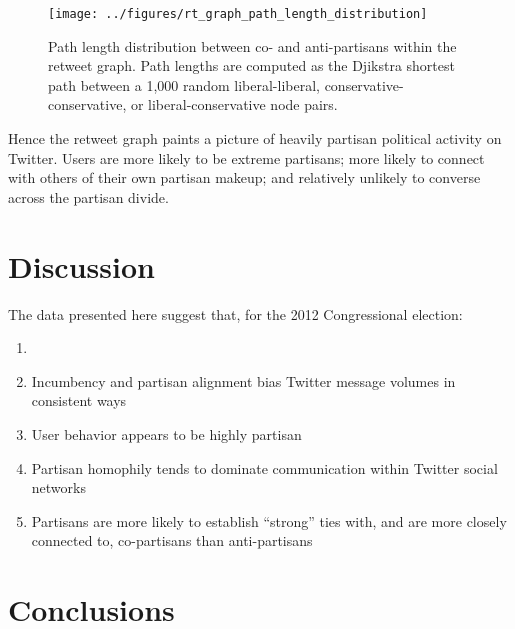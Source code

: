 \documentclass[11pt]{article}
\begin{document}
\begin{figure}[ht]
  \centering
  \texttt{[image: ../figures/rt\_graph\_path\_length\_distribution]}
  \caption{Path length distribution between co- and anti-partisans within the retweet graph. Path lengths are computed as the Djikstra shortest path between a 1,000 random liberal-liberal, conservative-conservative, or liberal-conservative node pairs. }
  \label{fig:rt-partisan-path-length}
\end{figure}

Hence the retweet graph paints a picture of heavily partisan political activity
on Twitter. Users are more likely to be extreme partisans; more likely
to connect with others of their own partisan makeup; and relatively
unlikely to converse across the partisan divide. 


\section{Discussion}
\label{sec:discussion}

The data presented here suggest that, for the 2012 Congressional election:

\begin{enumerate}
\item 
\item Incumbency and partisan alignment bias Twitter message volumes
  in consistent ways
\item User behavior appears to be highly partisan
\item Partisan homophily tends to dominate communication within
  Twitter social networks
\item  Partisans are more likely to establish ``strong'' ties with,
  and are more closely connected to,
  co-partisans than anti-partisans
\end{enumerate}



\section{Conclusions}
\label{sec:conclusions}
\end{document}
